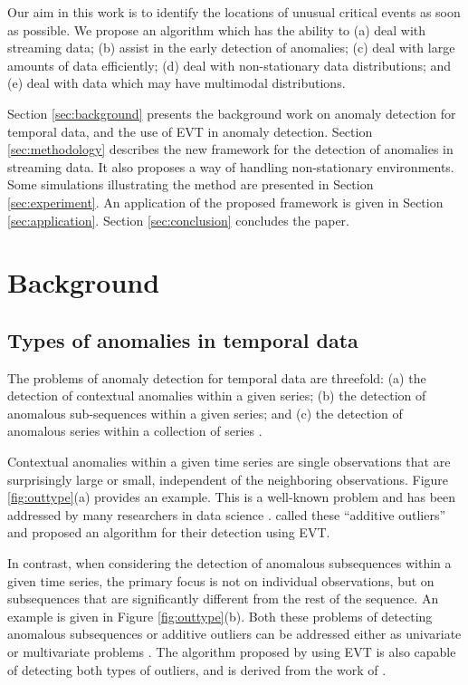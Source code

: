 \documentclass[12pt]{article}
\begin{document}
Our aim in this work is to identify the locations of unusual critical
events as soon as possible. We propose an algorithm which has the
ability to (a) deal with streaming data; (b) assist in the early
detection of anomalies; (c) deal with large amounts of data efficiently;
(d) deal with non-stationary data distributions; and (e) deal with data
which may have multimodal distributions.

Section \ref{sec:background} presents the background work on anomaly
detection for temporal data, and the use of EVT in anomaly detection.
Section \ref{sec:methodology} describes the new framework for the
detection of anomalies in streaming data. It also proposes a way of
handling non-stationary environments. Some simulations illustrating the
method are presented in Section \ref{sec:experiment}. An application of
the proposed framework is given in Section \ref{sec:application}.
Section \ref{sec:conclusion} concludes the paper.

\hypertarget{background}{%
\section{Background}\label{background}}

\label{sec:background}

\hypertarget{types-of-anomalies-in-temporal-data}{%
\subsection{Types of anomalies in temporal
data}\label{types-of-anomalies-in-temporal-data}}

\label{sec:anomtype}

The problems of anomaly detection for temporal data are threefold: (a)
the detection of contextual anomalies within a given series; (b) the
detection of anomalous sub-sequences within a given series; and (c) the
detection of anomalous series within a collection of series
\citep{gupta2014outlier}.

Contextual anomalies within a given time series are single observations
that are surprisingly large or small, independent of the neighboring
observations. Figure \ref{fig:outtype}(a) provides an example. This is a
well-known problem and has been addressed by many researchers in data
science \citep{hayes2015contextual}. \citet{burridge2006additive} called
these ``additive outliers'' and proposed an algorithm for their
detection using EVT.

In contrast, when considering the detection of anomalous subsequences
within a given time series, the primary focus is not on individual
observations, but on subsequences that are significantly different from
the rest of the sequence. An example is given in Figure
\ref{fig:outtype}(b). Both these problems of detecting anomalous
subsequences or additive outliers can be addressed either as univariate
\citep{bilen2002wavelet} or multivariate problems
\citep{riani2009finding, galeano2006outlier, pena2001multivariate}. The
algorithm proposed by \citet{schwarz2008wind} using EVT is also capable
of detecting both types of outliers, and is derived from the work of
\citet{burridge2006additive}.
\end{document}
